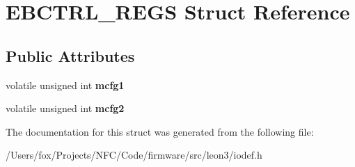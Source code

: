 \hypertarget{struct_e_b_c_t_r_l___r_e_g_s}{
\section{EBCTRL\_\-REGS Struct Reference}
\label{struct_e_b_c_t_r_l___r_e_g_s}
}
\subsection*{Public Attributes}
\begin{DoxyCompactItemize}
\item 
\hypertarget{struct_e_b_c_t_r_l___r_e_g_s_a42b783760649322ae6a82f855b04e56d}{
volatile unsigned int {\bfseries mcfg1}}
\label{struct_e_b_c_t_r_l___r_e_g_s_a42b783760649322ae6a82f855b04e56d}

\item 
\hypertarget{struct_e_b_c_t_r_l___r_e_g_s_ac86539cc949f6e053d0fae7c356c3ed9}{
volatile unsigned int {\bfseries mcfg2}}
\label{struct_e_b_c_t_r_l___r_e_g_s_ac86539cc949f6e053d0fae7c356c3ed9}

\end{DoxyCompactItemize}


The documentation for this struct was generated from the following file:\begin{DoxyCompactItemize}
\item 
/Users/fox/Projects/NFC/Code/firmware/src/leon3/iodef.h\end{DoxyCompactItemize}

